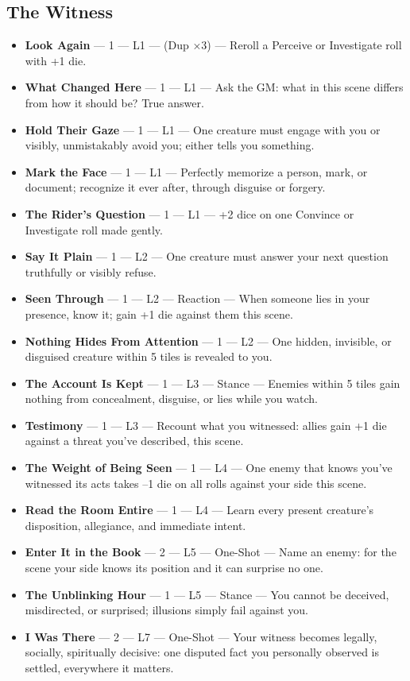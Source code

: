 \subsection{The Witness}
\begin{itemize}
    \item \textbf{Look Again} --- 1 --- L1 --- (Dup ×3) --- Reroll a Perceive or Investigate roll with +1 die.
    \item \textbf{What Changed Here} --- 1 --- L1 --- Ask the GM: what in this scene differs from how it should be? True answer.
    \item \textbf{Hold Their Gaze} --- 1 --- L1 --- One creature must engage with you or visibly, unmistakably avoid you; either tells you something.
    \item \textbf{Mark the Face} --- 1 --- L1 --- Perfectly memorize a person, mark, or document; recognize it ever after, through disguise or forgery.
    \item \textbf{The Rider's Question} --- 1 --- L1 --- +2 dice on one Convince or Investigate roll made gently.
    \item \textbf{Say It Plain} --- 1 --- L2 --- One creature must answer your next question truthfully or visibly refuse.
    \item \textbf{Seen Through} --- 1 --- L2 --- Reaction --- When someone lies in your presence, know it; gain +1 die against them this scene.
    \item \textbf{Nothing Hides From Attention} --- 1 --- L2 --- One hidden, invisible, or disguised creature within 5 tiles is revealed to you.
    \item \textbf{The Account Is Kept} --- 1 --- L3 --- Stance --- Enemies within 5 tiles gain nothing from concealment, disguise, or lies while you watch.
    \item \textbf{Testimony} --- 1 --- L3 --- Recount what you witnessed: allies gain +1 die against a threat you've described, this scene.
    \item \textbf{The Weight of Being Seen} --- 1 --- L4 --- One enemy that knows you've witnessed its acts takes --1 die on all rolls against your side this scene.
    \item \textbf{Read the Room Entire} --- 1 --- L4 --- Learn every present creature's disposition, allegiance, and immediate intent.
    \item \textbf{Enter It in the Book} --- 2 --- L5 --- One-Shot --- Name an enemy: for the scene your side knows its position and it can surprise no one.
    \item \textbf{The Unblinking Hour} --- 1 --- L5 --- Stance --- You cannot be deceived, misdirected, or surprised; illusions simply fail against you.
    \item \textbf{I Was There} --- 2 --- L7 --- One-Shot --- Your witness becomes legally, socially, spiritually decisive: one disputed fact you personally observed is settled, everywhere it matters.
\end{itemize}

